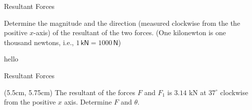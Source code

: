 \documentclass[9pt, xcolor={svgnames, x11names},professionalfonts]{beamer}
\def\scale{1}
\begin{document}

\begin{frame}{Resultant Forces}
	
	\begin{myexam}{}{}

		Determine the magnitude and the direction (measured clockwise from the the positive $x$-axis) of the resultant of the two forces. \parm\centering
		(One kilonewton is one thousand newtons, i.e., $1\,\mathsf{kN} = 1000\,\mathsf{N}$)
		\parb

		\begin{center}
			\def\scale{0.8}
			hello

		\end{center}
	\end{myexam}

\end{frame}


\begin{frame}{Resultant Forces}

	\begin{myexer}{}{}
		
		\parb

	\end{myexer}

	\begin{textblock*}{0.5\textwidth}(5.5cm, 5.75cm)
		The resultant of the forces $F$ and $F_1$ is $3.14$ kN at $37^\circ$ clockwise from the positive $x$ axis.\parm
		Determine $F$ and $\theta$.

	\end{textblock*}

\end{frame}
\end{document}
